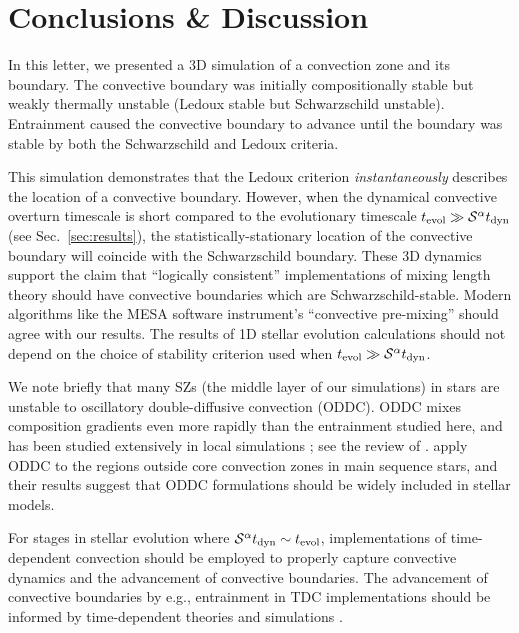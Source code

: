 \section{Conclusions \& Discussion}
\label{sec:conclusions}

In this letter, we presented a 3D simulation of a convection zone and its boundary.
The convective boundary was initially compositionally stable but weakly thermally unstable (Ledoux stable but Schwarzschild unstable).
Entrainment caused the convective boundary to advance until the boundary was stable by both the Schwarzschild and Ledoux criteria.

This simulation demonstrates that the Ledoux criterion \emph{instantaneously} describes the location of a convective boundary.
However, when the dynamical convective overturn timescale is short compared to the evolutionary timescale $t_{\rm{evol}} \gg \mathcal{S}^{\alpha} t_{\rm{dyn}}$ (see Sec.~\ref{sec:results}), the statistically-stationary location of the convective boundary will coincide with the Schwarzschild boundary.
These 3D dynamics support the claim that ``logically consistent'' implementations of mixing length theory \citep{gabriel_etal_2014, mesa4, mesa5} should have convective boundaries which are Schwarzschild-stable.
Modern algorithms like the MESA software instrument's ``convective pre-mixing'' \citep[CPM,][]{mesa5} should agree with our results.
The results of 1D stellar evolution calculations should not depend on the choice of stability criterion used when $t_{\rm{evol}} \gg \mathcal{S}^{\alpha} t_{\rm{dyn}}$.

We note briefly that many SZs (the middle layer of our simulations) in stars are unstable to oscillatory double-diffusive convection (ODDC).
ODDC mixes composition gradients even more rapidly than the entrainment studied here, and has been studied extensively in local simulations \citep{mirouh_etal_2012, wood_etal_2013, xie_etal_2017}; see the review of \citet{garaud_2018}.
\citet{moore_garaud_2016} apply ODDC to the regions outside core convection zones in main sequence stars, and their results suggest that ODDC formulations should be widely included in stellar models.

For stages in stellar evolution where $\mathcal{S}^{\alpha} t_{\rm{dyn}} \sim t_{\rm{evol}}$, implementations of time-dependent convection \citep[TDC,][]{tdc_1986} should be employed to properly capture convective dynamics and the advancement of convective boundaries.
The advancement of convective boundaries by e.g., entrainment in TDC implementations should be informed by time-dependent theories and simulations \citep[e.g.,][]{turner_1968, fuentes_cumming_2020}.

